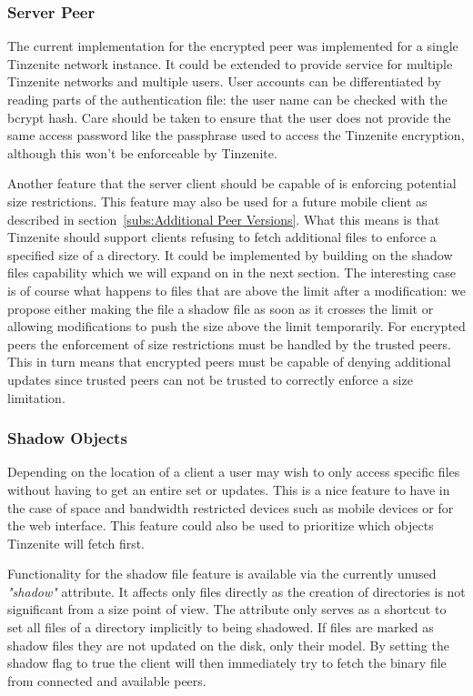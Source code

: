 \subsubsection{Server Peer}
\label{subs:Server Peer}

The current implementation for the encrypted peer was implemented for a single Tinzenite network instance.
It could be extended to provide service for multiple Tinzenite networks and multiple users.
User accounts can be differentiated by reading parts of the authentication file: the user name can be checked with the bcrypt hash.
Care should be taken to ensure that the user does not provide the same access password like the passphrase used to access the Tinzenite encryption, although this won't be enforceable by Tinzenite.

Another feature that the server client should be capable of is enforcing potential size restrictions.
This feature may also be used for a future mobile client as described in section~\ref{subs:Additional Peer Versions}.
What this means is that Tinzenite should support clients refusing to fetch additional files to enforce a specified size of a directory.
It could be implemented by building on the shadow files capability which we will expand on in the next section.
The interesting case is of course what happens to files that are above the limit after a modification: we propose either making the file a shadow file as soon as it crosses the limit or allowing modifications to push the size above the limit temporarily.
For encrypted peers the enforcement of size restrictions must be handled by the trusted peers.
This in turn means that encrypted peers must be capable of denying additional updates since trusted peers can not be trusted to correctly enforce a size limitation.

\subsubsection{Shadow Objects}
\label{subs:Shadow Objects}

Depending on the location of a client a user may wish to only access specific files without having to get an entire set or updates.
This is a nice feature to have in the case of space and bandwidth restricted devices such as mobile devices or for the web interface.
This feature could also be used to prioritize which objects Tinzenite will fetch first.

Functionality for the shadow file feature is available via the currently unused \textit{"shadow"} attribute.
It affects only files directly as the creation of directories is not significant from a size point of view.
The attribute only serves as a shortcut to set all files of a directory implicitly to being shadowed.
If files are marked as shadow files they are not updated on the disk, only their model.
By setting the shadow flag to true the client will then immediately try to fetch the binary file from connected and available peers.

